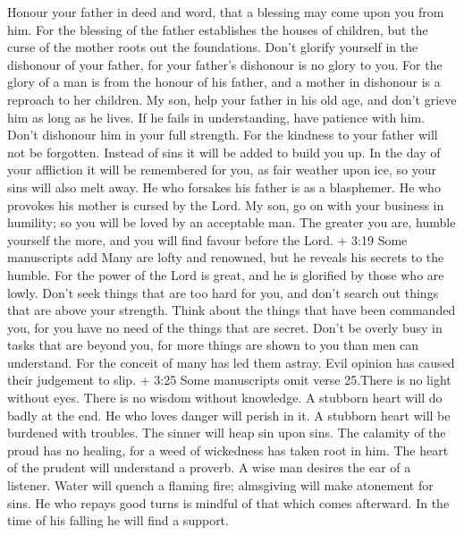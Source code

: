 Honour your father in deed and word, that a blessing may come upon you
from him.  For the blessing of the father establishes the
houses of children, but the curse of the mother roots out the
foundations.  Don't glorify yourself in the dishonour of
your father, for your father's dishonour is no glory to you.
 For the glory of a man is from the honour of his father,
and a mother in dishonour is a reproach to her children. 
My son, help your father in his old age, and don't grieve him as long as
he lives.  If he fails in understanding, have patience with
him. Don't dishonour him in your full strength.  For the
kindness to your father will not be forgotten. Instead of sins it will
be added to build you up.  In the day of your affliction it
will be remembered for you, as fair weather upon ice, so your sins will
also melt away.  He who forsakes his father is as a
blasphemer. He who provokes his mother is cursed by the Lord.
 My son, go on with your business in humility; so you will
be loved by an acceptable man.  The greater you are, humble
yourself the more, and you will find favour before the Lord.
 + 3:19 Some manuscripts add Many are lofty and renowned,
but he reveals his secrets to the humble.  For the power of
the Lord is great, and he is glorified by those who are lowly.
 Don't seek things that are too hard for you, and don't
search out things that are above your strength.  Think
about the things that have been commanded you, for you have no need of
the things that are secret.  Don't be overly busy in tasks
that are beyond you, for more things are shown to you than men can
understand.  For the conceit of many has led them astray.
Evil opinion has caused their judgement to slip.  + 3:25
Some manuscripts omit verse 25.There is no light without eyes. There is
no wisdom without knowledge.  A stubborn heart will do
badly at the end. He who loves danger will perish in it.  A
stubborn heart will be burdened with troubles. The sinner will heap sin
upon sins.  The calamity of the proud has no healing, for a
weed of wickedness has taken root in him.  The heart of the
prudent will understand a proverb. A wise man desires the ear of a
listener.  Water will quench a flaming fire; almsgiving
will make atonement for sins.  He who repays good turns is
mindful of that which comes afterward. In the time of his falling he
will find a support.

